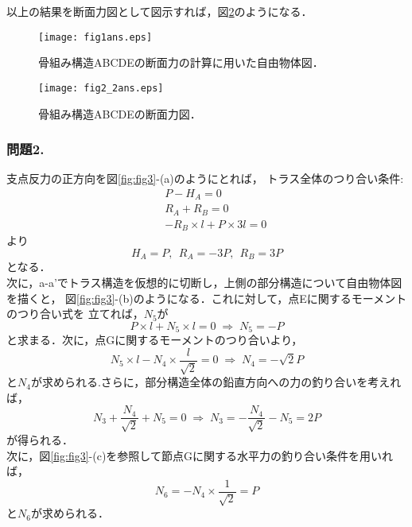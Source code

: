 \documentclass[10pt,a4j]{jarticle}
\begin{document}
以上の結果を断面力図として図示すれば，図\ref{fig:fig2}のようになる．
\begin{figure}[h]
	\begin{center}
	\texttt{[image: fig1ans.eps]} 
	\end{center}
	\caption{骨組み構造ABCDEの断面力の計算に用いた自由物体図．} 
	\label{fig:fig1}
\end{figure}
\begin{figure}[h]
	\begin{center}
	\texttt{[image: fig2\_2ans.eps]} 
	\end{center}
	\caption{骨組み構造ABCDEの断面力図．} 
	\label{fig:fig2}
\end{figure}
\subsubsection*{問題2.}
支点反力の正方向を図\ref{fig:fig3}-(a)のようにとれば，
トラス全体のつり合い条件:
\begin{eqnarray}
	&& P-H_A=0  \\
	&& R_A+R_B=0 \\  
	&& -R_B\times l + P \times 3l=0 
\end{eqnarray}
より
\begin{equation}
	H_A=P, \ \ 
	R_A=-3P, \ \ 
	R_B=3P
\end{equation}
となる．\\

次に，a-a'でトラス構造を仮想的に切断し，上側の部分構造について自由物体図を描くと，
図\ref{fig:fig3}-(b)のようになる．これに対して，点Eに関するモーメントのつり合い式を
立てれば，$N_5$が
\begin{equation}
	P\times l +N_5\times l=0
	\; \Rightarrow \;
	N_5=-P
\end{equation}
と求まる．次に，点Gに関するモーメントのつり合いより，
\begin{equation}
	N_5\times l -N_4\times \frac{l}{\sqrt{2}}=0
	\; \Rightarrow \;
	N_4=-\sqrt{2}P
\end{equation}
と$N_4$が求められる.さらに，部分構造全体の鉛直方向への力の釣り合いを考えれば，
\begin{equation}
	N_3+\frac{N_4}{\sqrt{2}}+N_5=0 
	\; \Rightarrow \;
	N_3=-\frac{N_4}{\sqrt{2}}-N_5=2P 
\end{equation}
が得られる．\\

次に，図\ref{fig:fig3}-(c)を参照して節点Gに関する水平力の釣り合い条件を用いれば，
\begin{equation}
	N_6=-N_4\times \frac{1}{\sqrt{2}}=P
\end{equation}
と$N_6$が求められる．\\
\end{document}
